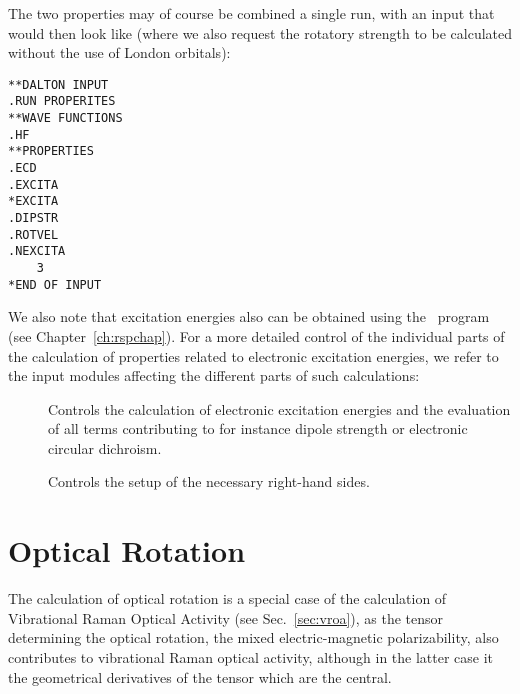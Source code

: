 The two properties may of course be combined a single run, with an
input that would then look like (where we also request the rotatory
strength to be calculated without the use of London orbitals):

\begin{verbatim}
**DALTON INPUT
.RUN PROPERITES
**WAVE FUNCTIONS
.HF
**PROPERTIES
.ECD
.EXCITA
*EXCITA
.DIPSTR
.ROTVEL
.NEXCITA
    3
*END OF INPUT
\end{verbatim}

We also note that excitation energies also can be obtained using the
\resp\ program (see Chapter~\ref{ch:rspchap}).
For a more detailed control of the individual parts of the 
calculation of properties related to electronic excitation energies,
we refer to the input modules affecting the different parts of such
calculations:

\begin{description}
\item[] Controls the calculation of electronic excitation
energies and the evaluation of all terms contributing to for instance
dipole strength or electronic circular dichroism.

\item[] Controls the setup of the necessary right-hand
sides.
\end{description}

\section{Optical Rotation}\label{sec:optrot}

\begin{center}
\end{center}

The calculation of optical rotation is a special case of the
calculation of Vibrational Raman Optical Activity (see
Sec.~\ref{sec:vroa}), as the tensor determining the optical rotation,
the mixed electric-magnetic polarizability, also contributes to
vibrational Raman optical activity, although in the latter case it the
geometrical derivatives of the tensor which are the central.

